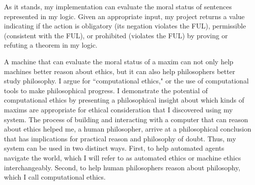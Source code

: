 \begin{isabellebody}
\begin{isamarkuptext}
As it stands, my implementation can evaluate the moral status of sentences represented in my logic. 
Given an appropriate input, my project returns a value indicating if the action is obligatory 
(its negation violates the FUL), permissible (consistent with the FUL), or prohibited (violates the FUL) 
by proving or refuting a theorem in my logic. 

A machine that can evaluate the moral status of a maxim can not only help machines better reason about ethics, 
but it can also help philosophers 
better study philosophy. I argue for ``computational ethics," or the use of computational tools to 
make philosophical progress. I demonstrate the potential of computational ethics by presenting a 
philosophical insight about which kinds of maxims are appropriate for ethical consideration that I 
discovered using my system. The process of building and interacting with a computer that can reason 
about ethics helped me, a human philosopher, arrive at a philosophical conclusion that has implications for practical
reason and philosophy of doubt. Thus, my system can be used in two distinct ways. First, to help
automated agents navigate the world, which I will refer to as automated ethics or machine ethics interchangeably. Second, 
to help human philosophers reason about philosophy, which I call computational ethics.%
\end{isamarkuptext}\isamarkuptrue%
%
\isadelimtheory
%
\endisadelimtheory
%
\isatagtheory
%
\endisatagtheory
{\isafoldtheory}%
%
\isadelimtheory
%
\endisadelimtheory
%
\end{isabellebody}%
\endinput
